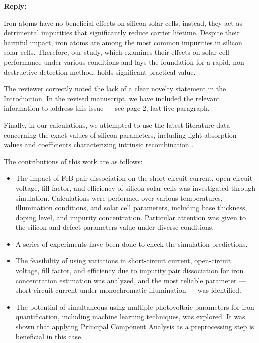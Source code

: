 \documentclass[a4paper,fleqn]{cas-sc}
\begin{document}

\noindent
\textcolor[rgb]{0.51,0.00,0.00}{\textbf{Reply:}}

Iron atoms have no beneficial effects on silicon solar cells;
instead, they act as detrimental impurities that significantly reduce carrier lifetime.
Despite their harmful impact, iron atoms are among the most common impurities in silicon solar cells.
Therefore, our study, which examines their effects on solar cell performance under various conditions and lays the foundation for a rapid, non-destructive detection method, holds significant practical value.

The reviewer correctly noted the lack of a clear novelty statement in the Introduction. 
In the revised manuscript, we have included the relevant information to address this issue --- see page 2, last five paragraph.


\begin{mdframed}
Finally, in our calculations, we attempted to use the latest literature data
concerning the exact values of silicon parameters, including light absorption values \cite{Green2022}
and coefficients characterizing intrinsic recombination \cite{Brad2022,AugerSi2022}.

\textcolor[rgb]{1.00,0.07,0.00}{
The contributions of this work are as follows:
\begin{itemize}[itemsep=2pt, parsep=0pt, topsep=0pt]
    \item The impact of FeB pair dissociation on the short-circuit current, open-circuit voltage, fill factor,
and efficiency of silicon solar cells was investigated through simulation.
Calculations were performed over various temperatures, illumination conditions, and solar cell parameters,
including base thickness, doping level, and impurity concentration.
Particular attention was given to the silicon and defect parameters value under diverse conditions.
    \item A series of experiments have been done to check the simulation predictions.
    \item The feasibility of using variations in short-circuit current, open-circuit voltage, fill factor,
and efficiency due to impurity pair dissociation for iron concentration estimation was analyzed,
and the most reliable parameter --- short-circuit current under monochromatic illumination --- was identified.
    \item The potential of simultaneous using multiple photovoltaic parameters for iron quantification, including machine learning techniques, was explored.
It was shown that applying Principal Component Analysis as a preprocessing step is beneficial in this case.
\end{itemize}
}
\end{mdframed}
\end{document}
